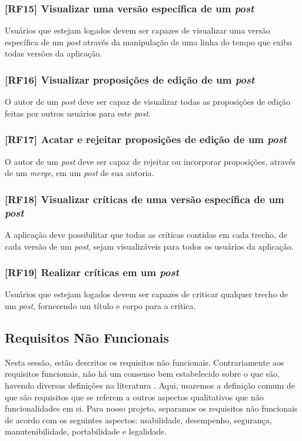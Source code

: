 \subsubsection{[RF15] Visualizar uma versão específica de um \textit{post}}
Usuários que estejam logados devem ser capazes de visualizar uma versão específica de um \textit{post} através da manipulação de uma linha do tempo que exiba todas versões da aplicação.

\subsubsection{[RF16] Visualizar proposições de edição de um \textit{post}}
O autor de um \textit{post} deve ser capaz de visualizar todas as proposições de edição feitas por outros usuários para este \textit{post}.

\subsubsection{[RF17] Acatar e rejeitar proposições de edição de um \textit{post}}
O autor de um \textit{post} deve ser capaz de rejeitar ou incorporar proposições, através de um \textit{merge}, em um \textit{post} de sua autoria.

\subsubsection{[RF18] Visualizar críticas de uma versão específica de um \textit{post}}
A aplicação deve possibilitar que todas as críticas contidas em cada trecho, de cada versão de um \textit{post}, sejam visualizáveis para todos os usuários da aplicação.

\subsubsection{[RF19] Realizar críticas em um \textit{post}}
Usuários que estejam logados devem ser capazes de criticar qualquer trecho de um \textit{post}, fornecendo um título e corpo para a crítica.



\subsection{Requisitos Não Funcionais}
Nesta sessão, estão descritos os requisitos não funcionais. Contrariamente aos requisitos funcionais, não há um consenso bem estabelecido sobre o que são, havendo diversas definições na literatura \cite{requirements, requirements2}. Aqui, usaremos a definição comum de que são requisitos que se referem a outros aspectos qualitativos que não funcionalidades em si. Para nosso projeto, separamos os requisitos não funcionais de acordo com os seguintes aspectos: usabilidade, desempenho, segurança, manutenibilidade, portabilidade e legalidade.

